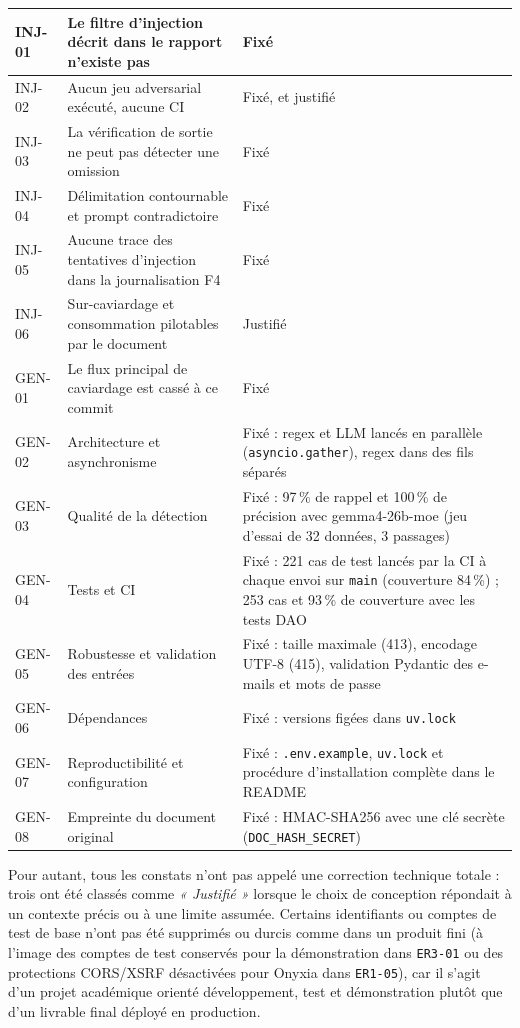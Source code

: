 \documentclass[12pt,a4paper]{article}
\begin{document}
\begin{longtable}{|>{\raggedright\arraybackslash}p{1.5cm}|
                  >{\raggedright\arraybackslash}p{6cm}|
                  >{\raggedright\arraybackslash}p{8cm}|}
\hline
INJ-01 & Le filtre d'injection décrit dans le rapport n'existe pas & Fixé \\
\hline
INJ-02 & Aucun jeu adversarial exécuté, aucune CI & Fixé, et justifié \\
\hline
INJ-03 & La vérification de sortie ne peut pas détecter une omission & Fixé \\
\hline
INJ-04 & Délimitation contournable et prompt contradictoire & Fixé \\
\hline
INJ-05 & Aucune trace des tentatives d'injection dans la journalisation F4 & Fixé \\
\hline
INJ-06 & Sur-caviardage et consommation pilotables par le document & Justifié \\
\hline
GEN-01 & Le flux principal de caviardage est cassé à ce commit & Fixé \\
\hline
GEN-02 & Architecture et asynchronisme & Fixé : regex et LLM lancés en parallèle (\texttt{asyncio.gather}), regex dans des fils séparés \\
\hline
GEN-03 & Qualité de la détection & Fixé : 97\,\% de rappel et 100\,\% de précision avec gemma4-26b-moe (jeu d'essai de 32 données, 3 passages) \\
\hline
GEN-04 & Tests et CI & Fixé : 221 cas de test lancés par la CI à chaque envoi sur \texttt{main} (couverture 84\,\%) ; 253 cas et 93\,\% de couverture avec les tests DAO \\
\hline
GEN-05 & Robustesse et validation des entrées & Fixé : taille maximale (413), encodage UTF-8 (415), validation Pydantic des e-mails et mots de passe \\
\hline
GEN-06 & Dépendances & Fixé : versions figées dans \texttt{uv.lock} \\
\hline
GEN-07 & Reproductibilité et configuration & Fixé : \texttt{.env.example}, \texttt{uv.lock} et procédure d'installation complète dans le README \\
\hline
GEN-08 & Empreinte du document original & Fixé : HMAC-SHA256 avec une clé secrète (\texttt{DOC\_HASH\_SECRET}) \\
\hline
\end{longtable}


Pour autant, tous les constats n'ont pas appelé une correction technique totale : trois ont été classés comme \textit{« Justifié »} lorsque le choix de conception répondait à un contexte précis ou à une limite assumée. Certains identifiants ou comptes de test de base n'ont pas été supprimés ou durcis comme dans un produit fini (à l'image des comptes de test conservés pour la démonstration dans \texttt{ER3-01} ou des protections CORS/XSRF désactivées pour Onyxia dans \texttt{ER1-05}), car il s'agit d'un projet académique orienté développement, test et démonstration plutôt que d'un livrable final déployé en production.
\end{document}
